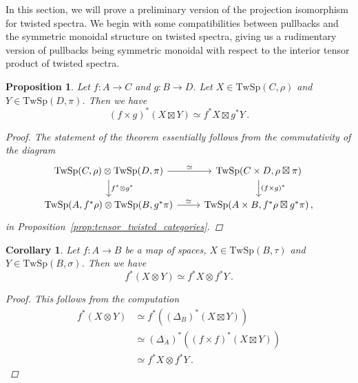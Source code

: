 \documentclass[10pt]{amsart}
\theoremstyle{plain}
\newtheorem{proposition}[theorem]{Proposition}
\newtheorem{corollary}[theorem]{Corollary}
\theoremstyle{definition}
\newcommand{\TwSp}{\mathrm{TwSp}}
\begin{document}
In this section, we will prove a preliminary version of the projection isomorphism for twisted spectra.
We begin with some compatibilities between pullbacks and the symmetric monoidal structure on twisted spectra, giving us a rudimentary version of pullbacks being symmetric monoidal with respect to the interior tensor product of twisted spectra.

\begin{proposition} \label{prop:boxtimes_pull}
  Let $f : A \to C$ and $g : B \to D$. Let $X \in \TwSp(C,\rho)$ and $Y \in \TwSp(D,\pi)$. Then we have
  \[
  (f \times g)^*(X \boxtimes Y) \simeq f^* X \boxtimes g^* Y \,.
  \]
  \begin{proof}
  The statement of the theorem essentially follows from the commutativity of the diagram
    \[
    \begin{tikzcd}
      \TwSp(C, \rho) \otimes \TwSp(D,\pi) \arrow[d,"f^* \otimes g^*"] \arrow[r,"\simeq"] & \TwSp(C \times D, \rho \boxtimes \pi) \arrow[d,"(f \times g)^*"] \\
      \TwSp(A,f^* \rho) \otimes \TwSp(B,g^* \pi) \arrow[r,"\simeq"] & \TwSp(A \times B , f^* \rho \boxtimes g^* \pi) \,,
    \end{tikzcd}
    \]
    in Proposition~\ref{prop:tensor_twisted_categories}.
  \end{proof}
\end{proposition}

\begin{corollary} \label{cor:pullback_symm_mon_prelim}
  Let $f : A \to B$ be a map of spaces, $X \in \TwSp(B,\tau)$ and $Y \in \TwSp(B,\sigma)$. Then we have
  \[
  f^*(X \otimes Y) \simeq f^* X \otimes f^* Y \,.
  \]
  \begin{proof}
    This follows from the computation
    \begin{align*}
      f^*(X \otimes Y) &\simeq f^*((\Delta_B)^*(X \boxtimes Y)) \\ &\simeq (\Delta_A)^*((f \times f)^*(X \boxtimes Y)) \\ &\simeq f^*X \otimes f^* Y \,.
    \end{align*}
  \end{proof}
\end{corollary}
\end{document}
